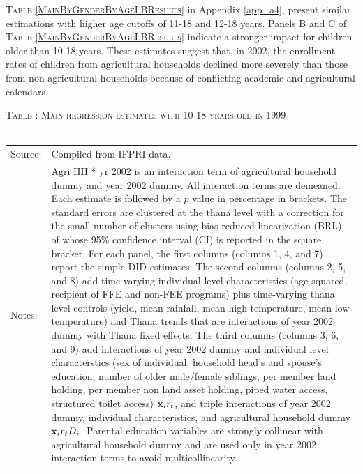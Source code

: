 \documentclass[12pt,letterpaper]{article}
\newcommand{\bfx}{\ensuremath{\mbox{\bf x}}}
\newcommand{\0}{\ensuremath{\mbox{\boldmath $0$}}}
\begin{document}
\textsc{\small Table \ref{MainByGenderByAgeLBResults}} in Appendix \ref{app_a4}, present similar estimations with higher age cutoffs of 11-18 and 12-18 years. Panels B and C of \textsc{Table \ref{MainByGenderByAgeLBResults}} indicate a stronger impact for children older than 10-18 years. These estimates suggest that, in 2002, the enrollment rates of children from agricultural households declined more severely than those from non-agricultural households because of conflicting academic and agricultural calendars.


\begin{table}\hfil\textsc{\footnotesize Table \thetable: Main regression estimates with 10-18 years old in 1999\label{base10}}\\\setlength{\tabcolsep}{.5pt}\renewcommand{\arraystretch}{.675}\hspace{-2em}\hfil\\\renewcommand{\arraystretch}{1}\hfil\begin{tabular}{>{\hfill\scriptsize}p{1cm}<{}>{\scriptsize}p{12cm}<{\hfill}} Source:& Compiled from IFPRI data. \\[-1ex] Notes:&   \textsf{Agri HH * yr 2002} is an interaction term of agricultural household dummy and year 2002 dummy. All interaction terms are demeaned. Each estimate is followed by a $p$ value in percentage in brackets. The standard errors are clustered at the thana level with a correction for the small number of clusters using bias-reduced linearization (BRL) of \citet{PustejovskyTipton2018} whose 95\% confidence interval (CI) is reported in the square bracket. 
For each panel, the first columns (columns 1, 4, and 7) report the simple DID estimates. The second columns (columns 2, 5, and 8) add time-varying individual-level characteristics (age squared, recipient of FFE and non-FEE programs) plus time-varying thana level controls (yield, mean rainfall, mean high temperature, mean low temperature) and \textsf{Thana trends} that are interactions of year 2002 dummy with Thana fixed effects. The third columns (columns 3, 6, and 9) add interactions of year 2002 dummy and individual level characterstics (sex of individual, household head's and spouse's education, number of older male/female siblings, per member land holding, per member non land asset holding, piped water access, structured toilet access) $\bfx_{i}r_{t}$, and triple interactions of year 2002 dummy, individual characteristics, and agricultural household dummy $\bfx_{i}r_{t}D_{i}$. Parental education variables are strongly collinear with agricultural household dummy and are used only in year 2002 interaction terms to avoid multicollinearity.  \end{tabular} \end{table}
\end{document}

